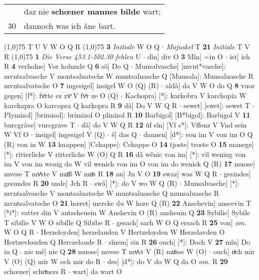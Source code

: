 \documentclass[8pt,a4paper,notitlepage]{article}
\begin{document}
\begin{table}[ht]
\begin{minipage}[t]{0.5\linewidth}
\begin{tabular}{rl}
 & daz nie \textbf{schœner mannes bilde} wart;\\ 
30 & dannoch was ich âne bart.\\ 
\end{tabular}
\scriptsize
\line(1,0){75} \newline
T U V W O Q R \newline
\line(1,0){75} \newline
\textbf{3} \textit{Initiale} W O Q   $\cdot$ \textit{Majuskel} T  \textbf{21} \textit{Initiale} T V R  \newline
\line(1,0){75} \newline
\textbf{1} \textit{Die Verse 453.1-502.30 fehlen} U   $\cdot$ dîn] div O \textbf{3} Mîn] ÷in O  $\cdot$ ist] ich R \textbf{4} verholne] Vor holnnde Q \textbf{6} sô] Do Q  $\cdot$ Munsalvasche] [mvnt*vasche]: mvntsalvasche V montsaluatschs W muntsaluasche Q [Munsala]: Munsaluasche R mvntsalvatsche O \textbf{7} ingesigel] insigel W O (Q) (R)  $\cdot$ aldâ] da V W O do Q \textbf{8} vuor gegen] [f*]: fvͦrte ez zvͦ V fvͦr ze O (Q)  $\cdot$ Kachopra] [*]: karkobra V karchopia W karchapra O karcopra Q karkopra R \textbf{9} dâ] Do V W Q R  $\cdot$ sewet] [swet]: sewet T  $\cdot$ Plymizol] [brimisol]: brimizol O plinizol R \textbf{10} Barbigol] [B*bigol]: Barbigol V \textbf{11} burcgrâve] vurcgrave T  $\cdot$ dâ] do V W Q R \textbf{12} ûf sîn] [Vf s*]: Vffenz V Vnd sein W Vf O  $\cdot$ insigel] ingesigel V (Q)  $\cdot$ ê] das Q  $\cdot$ dannen] [d*]: von im V von im O Q (R) von in W \textbf{13} knappen] [Cchappe]: Cchappe O \textbf{14} tjoste] troste O \textbf{15} manege] [*]: ritterliche V ritterliche W (O) Q R \textbf{16} dâ wênic von im] [*]: vil wening von im V von im wenig do W vil wenich von im O von im do wenick Q (R) \textbf{17} muose] mvese T mvͤste V muͦß W muͦs R \textbf{18} an] Jn V O \textbf{19} swaz] was W Q R  $\cdot$ gesindes] gesundes R \textbf{20} unde] Jch R  $\cdot$ swâ] [*]: do V wo W Q (R)  $\cdot$ Munsalvasche] [*]: mvntsalvasche V montsaluatsche W muntsaluasche Q munsaluasche R mvntsalvatsche O \textbf{21} hœret] mercke du W hore Q (R) \textbf{22} Anschevin] anscevin T [*i*]: vatter din V antscheuein W Anshevin O (R) ansheuin Q \textbf{23} Sybilie] Sybile T sibilie V W O sibille Q Sibibe R  $\cdot$ gesach] sach W O Q ersach R \textbf{25} von] \textit{om.} W O Q R  $\cdot$ Herzeloyden] herzelauden V Hertzeloyden W Herzelavden O Hertzevlouden Q Herczelaude R  $\cdot$ sînem] sin R \textbf{26} ouch] [*]: Doch V \textbf{27} mîn] Do in Q  $\cdot$ nie mê] nie Q \textbf{28} muose] mvese T mvͤst V (R) muͦsse W (O)  $\cdot$ ouch] oͮch mir V (O) (Q) mir W och mir do R  $\cdot$ des] [d*]: do V do W Q da O \textit{om.} R \textbf{29} schœner] schoͯners R  $\cdot$ wart] da wart O \newline
\end{minipage}
\end{table}
\end{document}
